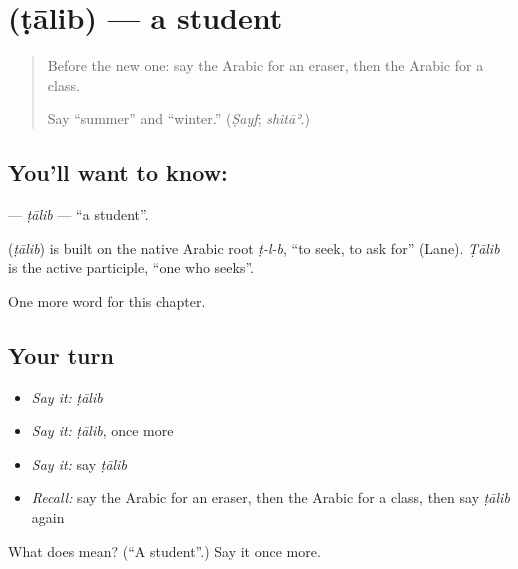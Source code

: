 \section[\texorpdfstring{\ar{طالب} (ṭālib)}{طالب (ṭālib)}]{ (ṭālib) — a student}

\label{lesson:AR-C143-talib}



\begin{quote}
Before the new one: say the Arabic for an eraser, then the Arabic for a class.

Say \textquotedblleft{}summer\textquotedblright{} and \textquotedblleft{}winter.\textquotedblright{} (\emph{Ṣayf}; \emph{shitāʾ}.)
\end{quote}

\subsection*{You'll want to know: }
\textbf{} — \emph{ṭālib} — \textquotedblleft{}a student\textquotedblright{}.

\begin{cousinweb}
\textbf{} (\emph{ṭālib}) is built on the native Arabic root \emph{ṭ-l-b}, \textquotedblleft{}to seek, to ask for\textquotedblright{} (Lane). \emph{Ṭālib} is the active participle, \textquotedblleft{}one who seeks\textquotedblright{}.
\end{cousinweb}

\begin{grammarlens}[title={What you've built}]
One more word for this chapter.
\end{grammarlens}

\subsection*{Your turn}
\begin{itemize}
\raggedright
  \item \emph{Say it:} \emph{ṭālib}
  \item \emph{Say it:} \emph{ṭālib}, once more
  \item \emph{Say it:} say \emph{ṭālib}
  \item \emph{Recall:} say the Arabic for an eraser, then the Arabic for a class, then say \emph{ṭālib} again
\end{itemize}

\begin{tcolorbox}[breakable,colback=teal!4,colframe=teal!35!black,title={Before you move on}]
What does  mean? (\textquotedblleft{}A student\textquotedblright{}.) Say it once more.
\end{tcolorbox}
